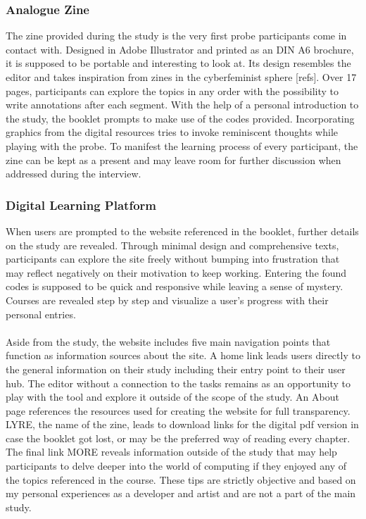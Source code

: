 \subsubsection{Analogue Zine}
The zine provided during the study is the very first probe participants come in contact with. Designed in Adobe Illustrator and printed as an DIN A6 brochure, it is supposed to be portable and interesting to look at. Its design resembles the editor and takes inspiration from zines in the cyberfeminist sphere [refs]. Over 17 pages, participants can explore the topics in any order with the possibility to write annotations after each segment. With the help of a personal introduction to the study, the booklet prompts to make use of the codes provided. Incorporating graphics from the digital resources tries to invoke reminiscent thoughts while playing with the probe. To manifest the learning process of every participant, the zine can be kept as a present and may leave room for further discussion when addressed during the interview.
\subsubsection{Digital Learning Platform}
When users are prompted to the website referenced in the booklet, further details on the study are revealed. Through minimal design and comprehensive texts, participants can explore the site freely without bumping into frustration that may reflect negatively on their motivation to keep working. Entering the found codes is supposed to be quick and responsive while leaving a sense of mystery. Courses are revealed step by step and visualize a user's progress with their personal entries. \\ \\
Aside from the study, the website includes five main navigation points that function as information sources about the site. A home link leads users directly to the general information on their study including their entry point to their user hub. The editor without a connection to the tasks remains as an opportunity to play with the tool and explore it outside of the scope of the study. An About page references the resources used for creating the website for full transparency. LYRE, the name of the zine, leads to download links for the digital pdf version in case the booklet got lost, or may be the preferred way of reading every chapter. The final link MORE reveals information outside of the study that may help participants to delve deeper into the world of computing if they enjoyed any of the topics referenced in the course. These tips are strictly objective and based on my personal experiences as a developer and artist and are not a part of the main study.
